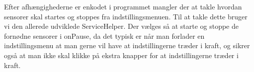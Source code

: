 Efter afhængighederne er enkodet i programmet mangler der at takle hvordan sensorer skal startes og stoppes fra indstillingsmenuen.
Til at takle dette bruger vi den allerede udviklede ServiceHelper.
Der vælges så at starte og stoppe de fornødne sensorer i onPause, da det typisk er når man forlader en indstillingsmenu at man gerne vil have at indstillingerne træder i kraft, og sikrer også at man ikke skal klikke på ekstra knapper for at indstillingerne træder i kraft.